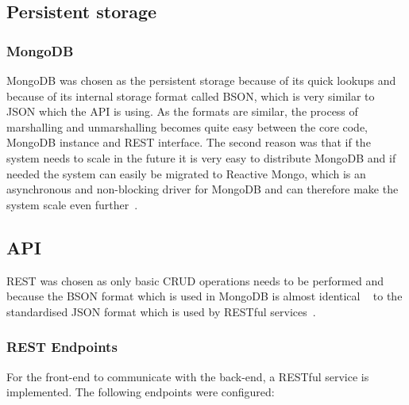 \documentclass[a4paper,12pt]{article}
\begin{document}
\subsection{Persistent storage}
\subsubsection{MongoDB}
MongoDB was chosen as the persistent storage because of its quick lookups and because of its internal storage 
format called BSON, which is very similar to JSON which the API is using. As the formats are similar, the process of 
marshalling and unmarshalling becomes quite easy between the core code, MongoDB instance and REST interface. 
The second reason was that if the system needs to scale in the future it is very easy to distribute MongoDB and if 
needed the system can easily be migrated to Reactive Mongo, which is an asynchronous and 
non-blocking driver for MongoDB and can therefore make the system scale even further~\cite{REACTIVEMONGO}.

\subsection{API}
REST was chosen as only basic CRUD operations needs to be performed and because the BSON format which is used in 
MongoDB is almost identical ~\cite{BSON} to the standardised JSON format which is used by RESTful services~\cite{JSON}. 

\subsubsection{REST Endpoints}
For the front-end to communicate with the back-end, a RESTful service is implemented.
The following endpoints were configured:
\end{document}

